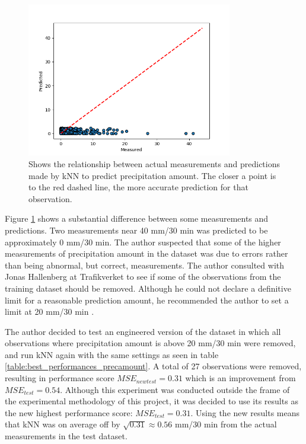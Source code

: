 \begin{figure}[H] 
	\centering
	\includegraphics[width=0.8\textwidth]{media/opticeye_predictions.png}
	\caption{Shows the relationship between actual measurements and predictions made by kNN to predict precipitation amount. The closer a point is to the red dashed line, the more accurate prediction for that observation. }
	\label{fig:scatter_precamount}
\end{figure}

	Figure \ref{fig:scatter_precamount} shows a substantial difference between some measurements and predictions. Two measurements near 40 mm/30 min was predicted to be approximately 0 mm/30 min. The author suspected that some of the higher measurements of precipitation amount in the dataset was due to errors rather than being abnormal, but correct, measurements. The author consulted with Jonas Hallenberg at Trafikverket to see if some of the observations from the training dataset should be removed. Although he could not declare a definitive limit for a reasonable prediction amount, he recommended the author to set a limit at 20 mm/30 min \cite{MAIL:2}.

	The author decided to test an engineered version of the dataset in which all observations where precipitation amount is above 20 mm/30 min were removed, and run kNN again with the same settings as seen in table \ref{table:best_performances_precamount}. A total of 27 observations were removed, resulting in performance score $MSE_{newtest} = 0.31$ which is an improvement from $MSE_{test} = 0.54$. Although this experiment was conducted outside the frame of the experimental methodology of this project, it was decided to use its results as the new highest performance score: $MSE_{test} = 0.31$. Using the new results means that kNN was on average off by $\sqrt{0.31} \approx 0.56$ mm/30 min from the actual measurements in the test dataset.

